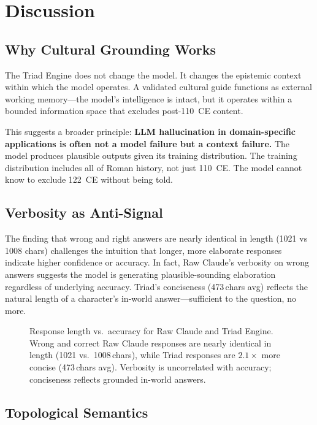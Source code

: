 \documentclass[11pt,a4paper]{article}
\begin{document}
\section{Discussion}

\subsection{Why Cultural Grounding Works}

The Triad Engine does not change the model. It changes the epistemic context
within which the model operates. A validated cultural guide functions as
external working memory---the model's intelligence is intact, but it operates
within a bounded information space that excludes post-110~CE content.

This suggests a broader principle: \textbf{LLM hallucination in
domain-specific applications is often not a model failure but a context
failure.} The model produces plausible outputs given its training
distribution. The training distribution includes all of Roman history, not
just 110~CE. The model cannot know to exclude 122~CE without being told.

\subsection{Verbosity as Anti-Signal}

The finding that wrong and right answers are nearly identical in length (1021
vs 1008 chars) challenges the intuition that longer, more elaborate responses
indicate higher confidence or accuracy. In fact, Raw Claude's verbosity on
wrong answers suggests the model is generating plausible-sounding elaboration
regardless of underlying accuracy. Triad's conciseness (473\,chars avg)
reflects the natural length of a character's in-world answer---sufficient to
the question, no more.

\begin{figure}[h]
\centering

\caption{Response length vs.\ accuracy for Raw Claude and Triad Engine.
Wrong and correct Raw Claude responses are nearly identical in length
(1021 vs.\ 1008\,chars), while Triad responses are $2.1\times$ more concise
(473\,chars avg). Verbosity is uncorrelated with accuracy; conciseness
reflects grounded in-world answers.}
\label{fig:compression_progression}
\end{figure}

\subsection{Topological Semantics}
\end{document}
